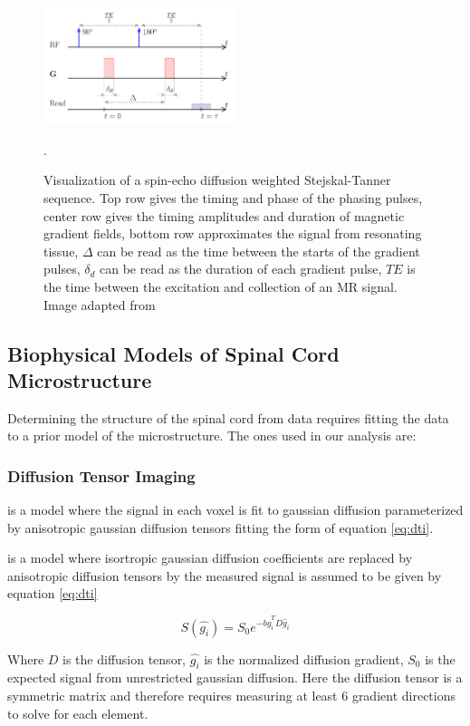 \begin{figure}
    \includegraphics[width=0.5\textwidth]{figures/sequence.png}
    \caption{Visualization of a spin-echo diffusion weighted Stejskal-Tanner sequence. Top row gives the timing and phase of the \dmri phasing pulses, center row gives the timing amplitudes and duration of magnetic gradient fields, bottom row approximates the signal from resonating tissue, $\Delta$ can be read as the time between the starts of the gradient pulses, $\delta_d$ can be read as the duration of each gradient pulse, $TE$ is the time between the excitation and collection of an MR signal. Image adapted from \cite{rohmer2006bloch}}.
    \label{fig:sequence}
\end{figure}

\subsection{Biophysical Models of Spinal Cord Microstructure}
Determining the structure of the spinal cord from \dmri data requires fitting the data to a prior model of the microstructure. The ones used in our analysis are:

\subsubsection{Diffusion Tensor Imaging}
\dti is a model where the signal in each voxel is fit to gaussian diffusion parameterized by anisotropic gaussian diffusion tensors fitting the form of equation \ref{eq:dti}.

\dti is a model where isortropic gaussian diffusion coefficients are replaced by anisotropic diffusion tensors by the measured signal is assumed to be given by equation \ref{eq:dti}
\fi

\begin{equation}
    S(\hat{g_i}) = S_0 e^{-b \hat{g}_i^T D \hat{g}_i}
    \label{eq:dti}
\end{equation}

Where $D$ is the diffusion tensor, $\hat{g_i}$ is the normalized diffusion gradient, $S_0$ is the expected signal from unrestricted gaussian diffusion. Here the diffusion tensor is a symmetric matrix and therefore requires measuring at least 6 gradient directions to solve for each element. \cite{vedantam2014diffusion}

